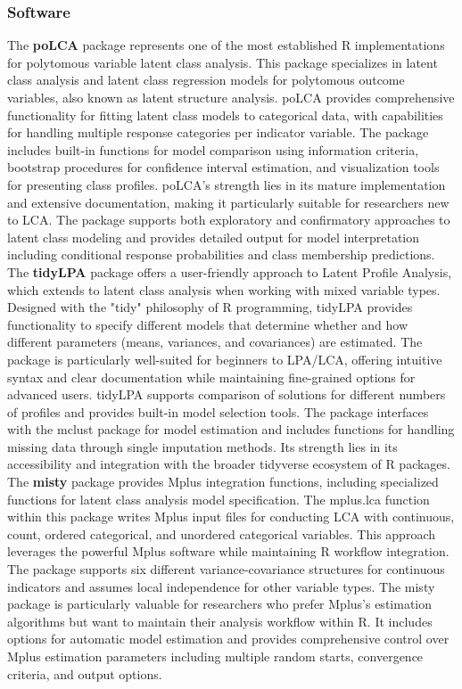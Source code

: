 \documentclass[main.tex]{subfiles}
\begin{document}
\subsubsection{Software}
The \textbf{poLCA} package represents one of the most established R implementations for polytomous variable latent class analysis\parencite{linzer2022}. This package specializes in latent class analysis and latent class regression models for polytomous outcome variables, also known as latent structure analysis. poLCA provides comprehensive functionality for fitting latent class models to categorical data, with capabilities for handling multiple response categories per indicator variable. The package includes built-in functions for model comparison using information criteria, bootstrap procedures for confidence interval estimation, and visualization tools for presenting class profiles. poLCA's strength lies in its mature implementation and extensive documentation, making it particularly suitable for researchers new to LCA. The package supports both exploratory and confirmatory approaches to latent class modeling and provides detailed output for model interpretation including conditional response probabilities and class membership predictions.
The \textbf{tidyLPA} package offers a user-friendly approach to Latent Profile Analysis, which extends to latent class analysis when working with mixed variable types\parencite{tidylpa2021}. Designed with the "tidy" philosophy of R programming, tidyLPA provides functionality to specify different models that determine whether and how different parameters (means, variances, and covariances) are estimated. The package is particularly well-suited for beginners to LPA/LCA, offering intuitive syntax and clear documentation while maintaining fine-grained options for advanced users. tidyLPA supports comparison of solutions for different numbers of profiles and provides built-in model selection tools. The package interfaces with the mclust package for model estimation and includes functions for handling missing data through single imputation methods. Its strength lies in its accessibility and integration with the broader tidyverse ecosystem of R packages.
The \textbf{misty} package provides Mplus integration functions, including specialized functions for latent class analysis model specification\parencite{misty2013}. The mplus.lca function within this package writes Mplus input files for conducting LCA with continuous, count, ordered categorical, and unordered categorical variables. This approach leverages the powerful Mplus software while maintaining R workflow integration. The package supports six different variance-covariance structures for continuous indicators and assumes local independence for other variable types. The misty package is particularly valuable for researchers who prefer Mplus's estimation algorithms but want to maintain their analysis workflow within R. It includes options for automatic model estimation and provides comprehensive control over Mplus estimation parameters including multiple random starts, convergence criteria, and output options.
\end{document}
